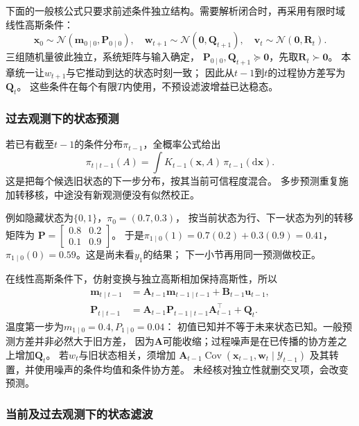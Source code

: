下面的一般核公式只要求前述条件独立结构。需要解析闭合时，再采用有限时域
线性高斯条件：
\[
 \bm x_0\sim\mathcal N(\bm m_{0\mid0},\bm P_{0\mid0}),\quad
 \bm w_{t+1}\sim\mathcal N(\bm0,\bm Q_{t+1}),\quad
 \bm v_t\sim\mathcal N(\bm0,\bm R_t).
\]
三组随机量彼此独立，系统矩阵与输入确定，
$\bm P_{0\mid0},\bm Q_{t+1}\succeq\bm0$，先取$\bm R_t\succ\bm0$。
本章统一让$w_{t+1}$与它推动到达的状态时刻一致；
因此从$t-1$到$t$的过程协方差写为$\bm Q_t$。
这些条件在每个有限$T$内使用，不预设滤波增益已达稳态。

\subsubsection{过去观测下的状态预测}

若已有截至$t-1$的条件分布$\pi_{t-1}$，全概率公式给出
\begin{equation}
 \pi_{t\mid t-1}(A)
     =\int K_{t-1}(\bm x,A)\,\pi_{t-1}(\mathrm d\bm x).
 \label{eq:dynamical-general-prediction-kernel}
\end{equation}
这是把每个候选旧状态的下一步分布，按其当前可信程度混合。
多步预测重复施加转移核，中途没有新观测便没有似然校正。

例如隐藏状态为$\{0,1\}$，$\pi_0=(0.7,0.3)$，
按当前状态为行、下一状态为列的转移矩阵为
$\bm P=\left[\begin{smallmatrix}0.8&0.2\\0.1&0.9\end{smallmatrix}\right]$。
于是$\pi_{1\mid0}(1)=0.7(0.2)+0.3(0.9)=0.41$，
$\pi_{1\mid0}(0)=0.59$。这是尚未看$y_1$的结果；
下一小节再用同一预测做校正。

在线性高斯条件下，仿射变换与独立高斯相加保持高斯性，所以
\begin{align}
 \bm m_{t\mid t-1}
   &=\bm A_{t-1}\bm m_{t-1\mid t-1}+\bm B_{t-1}\bm u_{t-1},
       \label{eq:dynamical-kalman-predicted-mean}\\
 \bm P_{t\mid t-1}
   &=\bm A_{t-1}\bm P_{t-1\mid t-1}\bm A_{t-1}^\top+\bm Q_t.
       \label{eq:dynamical-kalman-predicted-covariance}
\end{align}
温度第一步为$m_{1\mid0}=0.4,P_{1\mid0}=0.04$：
初值已知并不等于未来状态已知。一般预测方差并非必然大于旧方差，
因为$\bm A$可能收缩；过程噪声是在已传播的协方差之上增加$\bm Q_t$。
若$w_t$与旧状态相关，须增加
$\bm A_{t-1}\operatorname{Cov}(\bm x_{t-1},\bm w_t\mid\mathcal Y_{t-1})$
及其转置，并使用噪声的条件均值和条件协方差。
未经核对独立性就删交叉项，会改变预测。

\subsubsection{当前及过去观测下的状态滤波}

